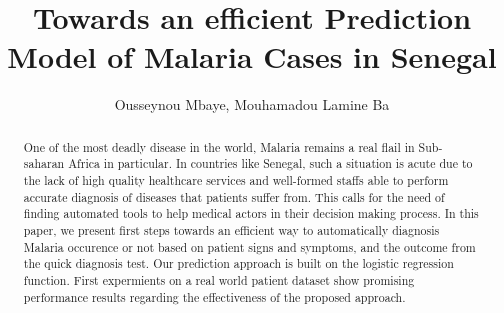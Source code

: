 \documentclass[runningheads]{llncs}
\begin{document}
%
\title{Towards an efficient Prediction Model of Malaria Cases in Senegal}
%
%
\author{Ousseynou Mbaye, Mouhamadou Lamine Ba}
%
%
%
\maketitle              %
%
\begin{abstract}
One of the most deadly disease in the world, Malaria remains a real flail in Sub-saharan Africa 
in particular. In countries like Senegal, such a situation is acute due to the lack of high quality
healthcare services and well-formed staffs able to perform accurate diagnosis of diseases that patients suffer from. 
This calls for the need of finding automated tools to help medical actors in their decision making process.
In this paper, we present first steps towards an efficient way to automatically diagnosis Malaria occurence or not 
based on patient signs and symptoms, and the outcome from the quick diagnosis test. Our prediction approach is built
on the logistic regression function. First expermients on a real world patient dataset show promising performance
results regarding the effectiveness of the proposed approach.
 
\end{abstract}
%
%












%
%
%
% 
% 
%
\end{document}
